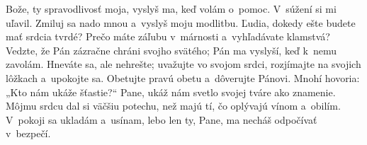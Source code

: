 Bože, ty spravodlivosť moja, vyslyš ma, keď volám o~pomoc.
V~súžení si mi uľavil.
\versseparator
Zmiluj sa nado mnou a~vyslyš moju modlitbu.
\versseparator
Ľudia, dokedy ešte budete mať srdcia tvrdé?
Prečo máte záľubu v~márnosti a~vyhľadávate klamstvá?
\versseparator
Vedzte, že Pán zázračne chráni svojho svätého;
Pán ma vyslyší, keď k~nemu zavolám.
\versseparator
Hneváte sa, ale nehrešte;
uvažujte vo svojom srdci,
rozjímajte na svojich lôžkach a~upokojte sa.
\versseparator
Obetujte pravú obetu
a~dôverujte Pánovi.
\versseparator
Mnohí hovoria: „Kto nám ukáže šťastie?“
Pane, ukáž nám svetlo svojej tváre ako znamenie.
\versseparator
Môjmu srdcu dal si väčšiu potechu,
než majú tí, čo oplývajú vínom a~obilím.
\versseparator
V~pokoji sa ukladám a~usínam,
\versseparator
lebo len ty, Pane, ma necháš odpočívať v~bezpečí.